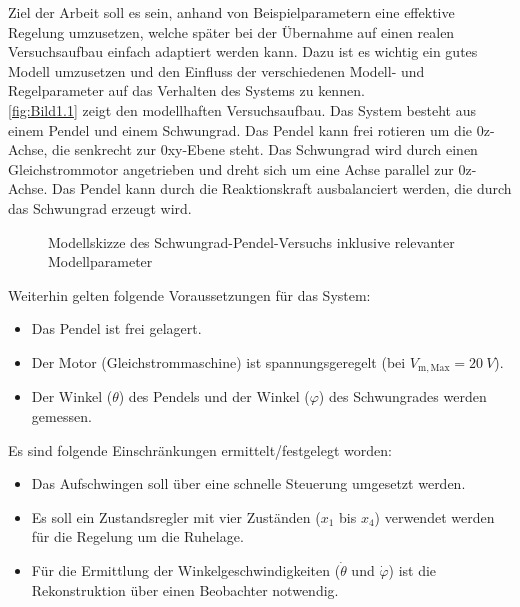 Ziel der Arbeit soll es sein, anhand von Beispielparametern eine effektive Regelung umzusetzen, welche später bei der Übernahme auf einen realen Versuchsaufbau einfach adaptiert werden kann. Dazu ist es wichtig ein gutes Modell umzusetzen und den Einfluss der verschiedenen Modell- und Regelparameter auf das Verhalten des Systems zu kennen.\\

\autoref{fig:Bild1.1} zeigt den modellhaften Versuchsaufbau. Das System besteht aus einem Pendel und einem Schwungrad. Das Pendel kann frei rotieren um die 0z-Achse, die senkrecht zur 0xy-Ebene steht. Das Schwungrad wird durch einen Gleichstrommotor angetrieben und dreht sich um eine Achse parallel zur 0z-Achse. Das Pendel kann durch die Reaktionskraft ausbalanciert werden, die durch das Schwungrad erzeugt wird.

\begin{figure}[H]
   \centering
   \caption[Modellskizze des Versuchs]{Modellskizze des Schwungrad-Pendel-Versuchs inklusive relevanter Modellparameter}
   \label{fig:Bild1.1}
\end{figure}

Weiterhin gelten folgende Voraussetzungen für das System:

\begin{itemize}
    \item Das Pendel ist frei gelagert.
    \item Der Motor (Gleichstrommaschine) ist spannungsgeregelt (bei $V_{\mathrm{m,Max}} = \SI{20}{V}$).
    \item Der Winkel ($\theta$) des Pendels und der Winkel ($\varphi$) des Schwungrades werden gemessen.
\end{itemize}

Es sind folgende Einschränkungen ermittelt/festgelegt worden:

\begin{itemize}
    \item Das Aufschwingen soll über eine schnelle Steuerung umgesetzt werden.
    \item Es soll ein Zustandsregler mit vier Zuständen ($x_{\mathrm{1}}$ bis $x_{\mathrm{4}}$) verwendet werden für die Regelung um die Ruhelage.
    \item Für die Ermittlung der Winkelgeschwindigkeiten ($\dot\theta$ und $\dot\varphi$) ist die Rekonstruktion über einen Beobachter notwendig.
\end{itemize}